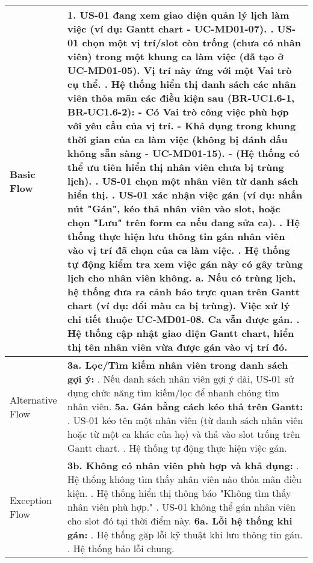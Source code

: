 \begin{longtable}{|m{4cm}|p{11cm}|}
Basic Flow & 1. US-01 đang xem giao diện quản lý lịch làm việc (ví dụ: Gantt chart - UC-MD01-07). \newline 2. US-01 chọn một vị trí/slot còn trống (chưa có nhân viên) trong một khung ca làm việc (đã tạo ở UC-MD01-05). Vị trí này ứng với một Vai trò cụ thể. \newline 3. Hệ thống hiển thị danh sách các nhân viên thỏa mãn các điều kiện sau (BR-UC1.6-1, BR-UC1.6-2): \newline    - Có Vai trò công việc phù hợp với yêu cầu của vị trí. \newline    - Khả dụng trong khung thời gian của ca làm việc (không bị đánh dấu không sẵn sàng - UC-MD01-15). \newline    - (Hệ thống có thể ưu tiên hiển thị nhân viên chưa bị trùng lịch). \newline 4. US-01 chọn một nhân viên từ danh sách hiển thị. \newline 5. US-01 xác nhận việc gán (ví dụ: nhấn nút "Gán", kéo thả nhân viên vào slot, hoặc chọn "Lưu" trên form ca nếu đang sửa ca). \newline 6. Hệ thống thực hiện lưu thông tin gán nhân viên vào vị trí đã chọn của ca làm việc. \newline 7. Hệ thống tự động kiểm tra xem việc gán này có gây trùng lịch cho nhân viên không. \newline    a. Nếu có trùng lịch, hệ thống đưa ra cảnh báo trực quan trên Gantt chart (ví dụ: đổi màu ca bị trùng). Việc xử lý chi tiết thuộc UC-MD01-08. Ca vẫn được gán. \newline 8. Hệ thống cập nhật giao diện Gantt chart, hiển thị tên nhân viên vừa được gán vào vị trí đó. \\
\hline
Alternative Flow & \textbf{3a. Lọc/Tìm kiếm nhân viên trong danh sách gợi ý:} \newline    1. Nếu danh sách nhân viên gợi ý dài, US-01 sử dụng chức năng tìm kiếm/lọc để nhanh chóng tìm nhân viên. \newline \textbf{5a. Gán bằng cách kéo thả trên Gantt:} \newline    1. US-01 kéo tên một nhân viên (từ danh sách nhân viên hoặc từ một ca khác của họ) và thả vào slot trống trên Gantt chart. \newline    2. Hệ thống tự động thực hiện việc gán. \\
\hline
Exception Flow & \textbf{3b. Không có nhân viên phù hợp và khả dụng:} \newline    1. Hệ thống không tìm thấy nhân viên nào thỏa mãn điều kiện. \newline    2. Hệ thống hiển thị thông báo "Không tìm thấy nhân viên phù hợp." \newline    3. US-01 không thể gán nhân viên cho slot đó tại thời điểm này. \newline \textbf{6a. Lỗi hệ thống khi gán:} \newline    1. Hệ thống gặp lỗi kỹ thuật khi lưu thông tin gán. \newline    2. Hệ thống báo lỗi chung. \\

\end{longtable}
